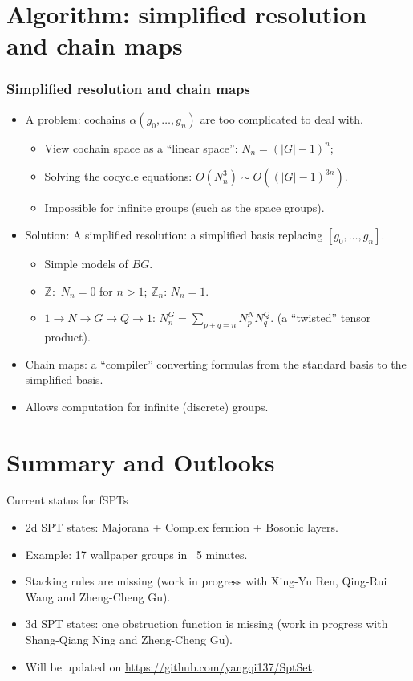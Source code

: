 \documentclass[xcolor=table, aspectratio=169]{beamer}
\begin{document}
\section{Algorithm: simplified resolution and chain maps}

\begin{frame}
  \frametitle{Simplified resolution and chain maps}
  \begin{itemize}
  \item A problem: cochains $\alpha(g_0,\ldots,g_n)$ are too complicated to deal with.
    \begin{itemize}
    \item View cochain space as a ``linear space'': $N_n = (|G|-1)^n$;
    \item Solving the cocycle equations: $O(N_n^3)\sim O((|G|-1)^{3n})$.
    \item Impossible for infinite groups (such as the space groups).
    \end{itemize}
  \item Solution: A simplified resolution: a simplified basis replacing $[g_0,\ldots,g_n]$.
    \begin{itemize}
    \item Simple models of $BG$.
    \item $\mathbb Z:$ $N_n=0$ for $n>1$; $\mathbb Z_n$: $N_n=1$.
    \item $1\rightarrow N\rightarrow G\rightarrow Q\rightarrow1$: $N_n^G=\sum_{p+q=n}N_p^NN_q^Q.$ (a ``twisted'' tensor product).
    \end{itemize}
  \item Chain maps: a ``compiler'' converting formulas from the standard basis to the simplified basis.
  \item Allows computation for infinite (discrete) groups.
  \end{itemize}
\end{frame}

\section{Summary and Outlooks}

\begin{frame}{Current status for fSPTs}
	\begin{itemize}
		\item 2d SPT states: Majorana + Complex fermion + Bosonic layers.
		\item Example: 17 wallpaper groups in ~5 minutes.
		\item Stacking rules are missing (work in progress with Xing-Yu Ren, Qing-Rui Wang and Zheng-Cheng Gu).
		\item 3d SPT states: one obstruction function is missing (work in progress with Shang-Qiang Ning and Zheng-Cheng Gu).
		\item Will be updated on \url{https://github.com/yangqi137/SptSet}.
	\end{itemize}
\end{frame}
\end{document}
